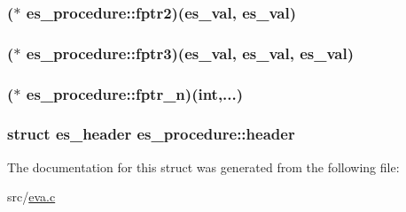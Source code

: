 \hypertarget{structes__procedure_ac8e2043d3ff3b45a4a93dd0653fbd384}{
\subsubsection[{fptr2}]{($\ast$ es\-\_\-procedure\-::fptr2)({\bf es\-\_\-val}, {\bf es\-\_\-val})}}\label{structes__procedure_ac8e2043d3ff3b45a4a93dd0653fbd384}
\hypertarget{structes__procedure_a25b5bb2d6a44c4f17f1171d7d5019bb0}{
\subsubsection[{fptr3}]{($\ast$ es\-\_\-procedure\-::fptr3)({\bf es\-\_\-val}, {\bf es\-\_\-val}, {\bf es\-\_\-val})}}\label{structes__procedure_a25b5bb2d6a44c4f17f1171d7d5019bb0}
\hypertarget{structes__procedure_a3a90709604974ef803bfbe6db292ea2b}{
\subsubsection[{fptr\-\_\-n}]{($\ast$ es\-\_\-procedure\-::fptr\-\_\-n)(int,...)}}\label{structes__procedure_a3a90709604974ef803bfbe6db292ea2b}
\hypertarget{structes__procedure_afc79bc7c13cc7e15b6314dd6d3c67b3e}{
\subsubsection[{header}]{\setlength{\rightskip}{0pt plus 5cm}struct {\bf es\-\_\-header} es\-\_\-procedure\-::header}}\label{structes__procedure_afc79bc7c13cc7e15b6314dd6d3c67b3e}


The documentation for this struct was generated from the following file\-:\begin{DoxyCompactItemize}
\item 
src/\hyperlink{eva_8c}{eva.\-c}\end{DoxyCompactItemize}
